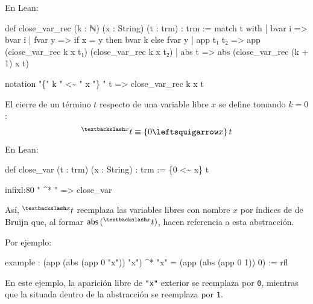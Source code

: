 \documentclass[
  spanish,
  letterpaper,
  DIV=11,
  numbers=noendperiod]{scrreprt}
\newenvironment{Shaded}{\begin{snugshade}}{\end{snugshade}}
\newcommand{\KeywordTok}[1]{\textcolor[rgb]{0.00,0.23,0.31}{\textbf{#1}}}
\newcommand{\NormalTok}[1]{\textcolor[rgb]{0.00,0.23,0.31}{#1}}
\newcommand{\StringTok}[1]{\textcolor[rgb]{0.13,0.47,0.30}{#1}}
\renewcommand{\NormalTok}[1]{\textcolor[HTML]{000000}{#1}}
\renewcommand{\KeywordTok}[1]{\textcolor[HTML]{0000FF}{#1}}
\renewcommand{\StringTok}[1]{\textcolor[HTML]{A52A2A}{#1}}
\theoremstyle{remark}
\begin{document}
En Lean:

\begin{Shaded}
\begin{Highlighting}[]
\KeywordTok{def}\NormalTok{ close\_var\_rec (k : ℕ) (x : String) (t : trm) : trm :=}
  \KeywordTok{match}\NormalTok{ t }\KeywordTok{with}
\NormalTok{  | bvar i    =\textgreater{} bvar i}
\NormalTok{  | fvar y    =\textgreater{} if x = y then bvar k else fvar y}
\NormalTok{  | app t₁ t₂ =\textgreater{} app (close\_var\_rec k x t₁) (close\_var\_rec k x t₂)}
\NormalTok{  | abs t     =\textgreater{} abs (close\_var\_rec (k + 1) x t)}

\KeywordTok{notation} \StringTok{"\{"}\NormalTok{ k }\StringTok{" \textless{}\textasciitilde{} "}\NormalTok{ x }\StringTok{"\} "}\NormalTok{ t =\textgreater{} close\_var\_rec k x t}
\end{Highlighting}
\end{Shaded}

El cierre de un término \(t\) respecto de una variable libre \(x\) se
define tomando \(k=0\): \[
{}^{\textbackslash x} t \equiv \{0 \leftsquigarrow x \} \, t
\] En Lean:

\begin{Shaded}
\begin{Highlighting}[]
\KeywordTok{def}\NormalTok{ close\_var (t : trm) (x : String) : trm :=}
\NormalTok{  \{0 \textless{}\textasciitilde{} x\} t}

\NormalTok{infixl:80 }\StringTok{" \^{}* "}\NormalTok{ =\textgreater{} close\_var}
\end{Highlighting}
\end{Shaded}

Así, \({}^{\textbackslash x} t\) reemplaza las variables libres con
nombre \(x\) por índices de de Bruijn que, al formar
\(\mathsf{abs} \, ({}^{\textbackslash x} t)\), hacen referencia a esta
abstracción.

Por ejemplo:

\begin{Shaded}
\begin{Highlighting}[]
\KeywordTok{example}\NormalTok{ :}
\NormalTok{  (app (abs (app 0 }\StringTok{"x"}\NormalTok{)) }\StringTok{"x"}\NormalTok{) \^{}* }\StringTok{"x"}\NormalTok{ = (app (abs (app 0 1)) 0) := }\KeywordTok{rfl}
\end{Highlighting}
\end{Shaded}

En este ejemplo, la aparición libre de \texttt{"x"} exterior se
reemplaza por \texttt{0}, mientras que la situada dentro de la
abstracción se reemplaza por \texttt{1}.
\end{document}
